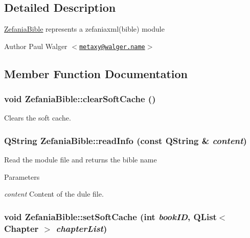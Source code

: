 \subsection{Detailed Description}
\hyperlink{classZefaniaBible}{ZefaniaBible} represents a zefaniaxml(bible) module

\begin{DoxyAuthor}{Author}
Paul Walger $<$\href{mailto:metaxy@walger.name}{\tt metaxy@walger.name}$>$ 
\end{DoxyAuthor}


\subsection{Member Function Documentation}
\hypertarget{classZefaniaBible_ae93f27ca8ff9b7076cbe7df1575d2228}{
\subsubsection[{clearSoftCache}]{\setlength{\rightskip}{0pt plus 5cm}void ZefaniaBible::clearSoftCache ()}}
\label{classZefaniaBible_ae93f27ca8ff9b7076cbe7df1575d2228}
Clears the soft cache. \hypertarget{classZefaniaBible_a2295f264abb8c603d6160d004327f9b9}{
\subsubsection[{readInfo}]{\setlength{\rightskip}{0pt plus 5cm}QString ZefaniaBible::readInfo (const QString \& {\em content})}}
\label{classZefaniaBible_a2295f264abb8c603d6160d004327f9b9}
Read the module file and returns the bible name 
\begin{DoxyParams}{Parameters}
\item[{\em content}]Content of the dule file. \end{DoxyParams}
\hypertarget{classZefaniaBible_aed51eb121c18afbb927fd9dd27eb067c}{
\subsubsection[{setSoftCache}]{\setlength{\rightskip}{0pt plus 5cm}void ZefaniaBible::setSoftCache (int {\em bookID}, \/  QList$<$ {\bf Chapter} $>$ {\em chapterList})}}
